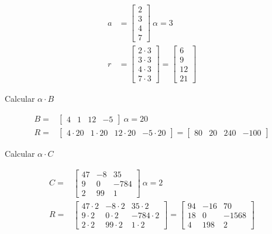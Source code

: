 \begin{align*}
    a &=
    \begin{bmatrix}
        2 \\
        3\\
        4\\
        7
    \end{bmatrix}
    \ \alpha = 3\\
    r &=
    \begin{bmatrix}
        2\cdot 3 \\
        3\cdot3\\
        4\cdot3\\
        7\cdot3
    \end{bmatrix}
=
    \begin{bmatrix}
        6 \\
        9\\
        12\\
        21
    \end{bmatrix}
\end{align*}


Calcular $ \alpha\cdot B $

\begin{align*}
    B =
    &\begin{bmatrix}
        4 & 1 & 12 & -5
    \end{bmatrix}
    \ \alpha = 20\\
    R =
    &\begin{bmatrix}
        4\cdot20 & 1\cdot20 & 12\cdot20 & -5\cdot20
    \end{bmatrix}
    =
    \begin{bmatrix}
        80 & 20 & 240 & -100
    \end{bmatrix}
\end{align*}


Calcular $ \alpha\cdot C $

\begin{align*}
    C =
    &\begin{bmatrix}
        47 & -8 & 35\\
        9 & 0 & -784 \\
        2 & 99 & 1
    \end{bmatrix}
    \ \alpha = 2\\
    R=
    &\begin{bmatrix}
        47\cdot2 & -8\cdot2 & 35\cdot2\\
        9\cdot2 & 0\cdot2 & -784\cdot2 \\
        2\cdot2 & 99\cdot2 & 1\cdot2
    \end{bmatrix}
    =
    \begin{bmatrix}
        94 & -16 & 70\\
        18 & 0 & -1568 \\
        4 & 198 & 2
    \end{bmatrix}
\end{align*}



